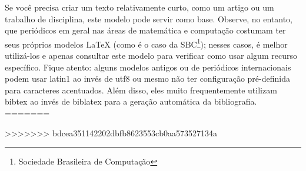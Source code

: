 Se você precisa criar um texto relativamente curto, como um artigo ou
um trabalho de disciplina, este modelo pode servir como base. Observe,
no entanto, que periódicos em geral nas áreas de matemática e computação
costumam ter seus próprios modelos \LaTeX{} (como é o caso da
SBC\footnote{Sociedade Brasileira de Computação}\nocite{sbctemplate});
nesses casos, é melhor utilizá-los e apenas consultar este modelo para
verificar como usar algum recurso específico. Fique atento: alguns modelos
antigos ou de periódicos internacionais podem usar \textsf{latin1} ao
invés de \textsf{utf8} ou mesmo não ter configuração pré-definida para
caracteres acentuados. Além disso, eles muito frequentemente utilizam
bibtex ao invés de biblatex para a geração automática da bibliografia.
=======



\avisoArtigo
>>>>>>> bdcea351142202dbfb8623553cb0aa573527134a
